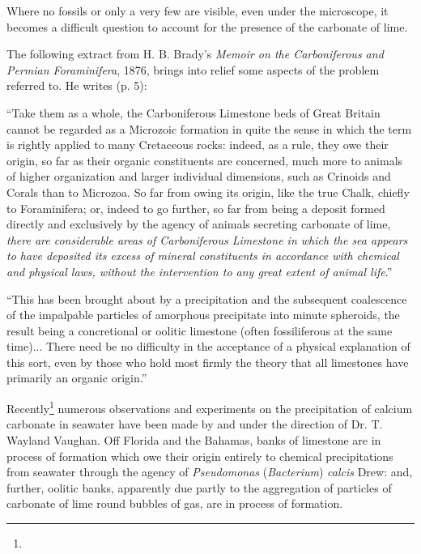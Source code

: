 \documentclass[a4paper, 12pt, oneside]{article}
\begin{document}
Where no fossils or only a very few are visible, even under the microscope, it becomes a difficult question to account for the presence of the carbonate of lime.

The following extract from H. B. Brady's \emph{Memoir on the Carboniferous and Permian Foraminifera}, 1876, brings into relief some aspects of the problem referred to. He writes (p. 5):

``Take them as a whole, the Carboniferous Limestone beds of Great Britain cannot be regarded as a Microzoic formation in quite the sense in which the term is rightly applied to many Cretaceous rocks: indeed, as a rule, they owe their origin, so far as their organic constituents are concerned, much more to animals of higher organization and larger individual dimensions, such as Crinoids and Corals than to Microzoa. So far from owing its origin, like the true Chalk, chiefly to Foraminifera; or, indeed to go further, so far from being a deposit formed directly and exclusively by the agency of animals secreting carbonate of lime, \emph{there are considerable areas of Carboniferous Limestone in which the sea appears to have deposited its excess of mineral constituents in accordance with chemical and physical laws, without the intervention to any great extent of animal life}.''

``This has been brought about by a precipitation and the subsequent coalescence of the impalpable particles of amorphous precipitate into minute spheroids, the result being a concretional or oolitic limestone (often fossiliferous at the same time)... There need be no difficulty in the acceptance of a physical explanation of this sort, even by those who hold most firmly the theory that all limestones have primarily an organic origin.''

Recently\footnote{} numerous observations and experiments on the precipitation of calcium carbonate in seawater have been made by and under the direction of Dr. T. Wayland Vaughan. Off Florida and the Bahamas, banks of limestone are in process of formation which owe their origin entirely to chemical precipitations from seawater through the agency of \emph{Pseudomonas} (\emph{Bacterium}) \emph{calcis} Drew: and, further, oolitic banks, apparently due partly to the aggregation of particles of carbonate of lime round bubbles of gas, are in process of formation.
\end{document}

